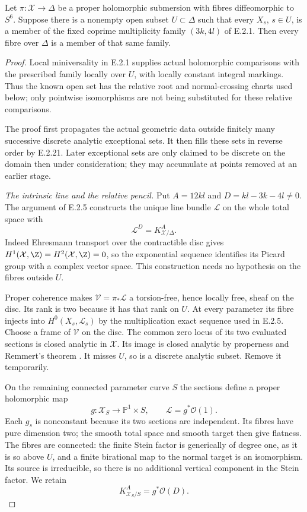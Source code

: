 \begin{proposition}
Let $\pi:\mathcal X\to\Delta$ be a proper holomorphic
submersion with fibres diffeomorphic to $S^6$.  Suppose
there is a nonempty open subset $U\subset\Delta$ such
that every $X_s$, $s\in U$, is a member of the fixed
coprime multiplicity family $(3k,4l)$ of E.2.1.
Then every fibre over $\Delta$ is a member of that
same family.
\end{proposition}
\begin{proof}
Local miniversality in E.2.1 supplies actual
holomorphic comparisons with the prescribed family
locally over $U$, with locally constant integral
markings.  Thus the known open set has the relative
root and normal-crossing charts used below; only
pointwise isomorphisms are not being substituted
for these relative comparisons.

The proof first propagates the actual geometric data
outside finitely many successive discrete analytic
exceptional sets.  It then fills these sets in reverse
order by E.2.21.  Later exceptional sets are only
claimed to be discrete on the domain then under
consideration; they may accumulate at points removed
at an earlier stage.

\emph{The intrinsic line and the relative pencil.}
Put $A=12kl$ and $D=kl-3k-4l\ne0$.
The argument of E.2.5 constructs the unique line
bundle $\mathcal L$ on the whole total space with
\[
 \mathcal L^D=K_{\mathcal X/\Delta}^{A}.
\]
Indeed Ehresmann transport over the contractible disc
gives $H^1(\mathcal X,\Z)=H^2(\mathcal X,\Z)=0$,
so the exponential sequence identifies its Picard
group with a complex vector space.  This construction
needs no hypothesis on the fibres outside $U$.

Proper coherence makes $\mathcal V=\pi_*\mathcal L$
a torsion-free, hence locally free, sheaf on the
disc.  Its rank is two because it has that rank
on $U$.  At every parameter its fibre injects
into $H^0(X_s,\mathcal L_s)$ by the multiplication
exact sequence used in E.2.5.  Choose a frame
of $\mathcal V$ on the disc.  The common zero
locus of its two evaluated sections is closed
analytic in $\mathcal X$.  Its image is closed
analytic by properness and Remmert's theorem
\cite[Chapter~II, Theorem~8.8]{Demailly2012E}.
It misses $U$, so is a discrete analytic subset.
Remove it temporarily.

On the remaining connected parameter curve $S$
the sections define a proper holomorphic map
\[
 g:\mathcal X_S\longrightarrow\mathbb P^1\times S,
 \qquad \mathcal L=g^*\mathcal O(1).
 \tag{E.2.22.1}
\]
Each $g_s$ is nonconstant because its two sections
are independent.  Its fibres have pure dimension
two; the smooth total space and smooth target
then give flatness.  The fibres are connected:
the finite Stein factor is generically of degree
one, as it is so above $U$, and a finite
birational map to the normal target is an
isomorphism.  Its source is irreducible, so
there is no additional vertical component
in the Stein factor.  We retain
\[
 K_{\mathcal X_S/S}^{A}=g^*\mathcal O(D).
 \tag{E.2.22.2}
\]


\end{proof}
